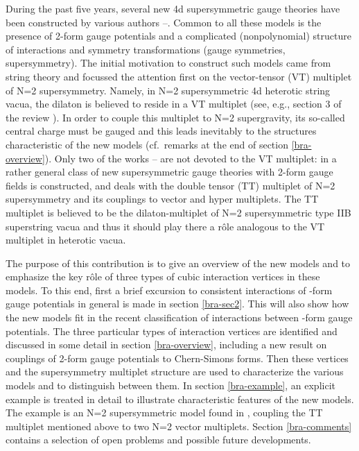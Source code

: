 \documentclass[a4paper,12pt]{article}
\begin{document}
During the past five years, several new
4d supersymmetric gauge theories have been constructed
by various authors 
\cite{bra-1}--\cite{bra-13}.
Common to all these
models is the presence of 2-form gauge potentials
and a complicated (nonpolynomial) structure of
interactions and symmetry transformations (gauge symmetries, supersymmetry).
The initial motivation to construct such models came from
string theory and focussed the attention first
on the vector-tensor (VT) multiplet
\cite{bra-VT1,bra-VT2} of N=2 supersymmetry. 
Namely, in N=2 supersymmetric 4d heterotic string vacua,
the dilaton is believed to reside in a VT multiplet
(see, e.g., section 3 of the review \cite{bra-LF}). 
In order to couple this multiplet
to N=2 supergravity, its so-called central charge must be gauged
and this leads inevitably to the structures
characteristic of the new models (cf.\ remarks at the end
of section \ref{bra-overview}).
Only two of the works \cite{bra-1}--\cite{bra-13} are not
devoted to the VT multiplet: in \cite{bra-11}
a rather general class of new supersymmetric gauge theories
with 2-form gauge fields is constructed, and \cite{bra-13}
deals with the double tensor (TT) multiplet
of N=2 supersymmetry and its couplings to vector and hyper multiplets.
The TT multiplet is believed to be the dilaton-multiplet
of N=2 supersymmetric type IIB superstring vacua \cite{bra-LF} and thus 
it should play there a r\^ole analogous to the VT multiplet 
in heterotic vacua.

The purpose of this contribution is to give an overview
of the new models and to emphasize the key r\^ole of
three types of cubic interaction vertices in these models.
To this end, first a brief
excursion to consistent interactions of \coordHE{}-form gauge potentials
in general is made in section \ref{bra-sec2}. This will also show
how the new models fit in the recent
classification \cite{bra-HK1,bra-HK2,bra-HK3} of interactions
between \coordHE{}-form gauge potentials. The
three particular types of interaction vertices are identified
and discussed in some detail in section \ref{bra-overview},
including a new result on couplings of 2-form gauge potentials
to Chern-Simons forms. Then
these vertices and the supersymmetry multiplet structure
are used to characterize the various
models and to distinguish between them.
In section \ref{bra-example}, an explicit example
is treated in detail to illustrate characteristic features 
of the new models.
The example is an N=2 supersymmetric model 
found in \cite{bra-13},
coupling the TT multiplet mentioned above
to two N=2 vector multiplets. Section \ref{bra-comments} contains 
a selection of open problems and possible
future developments.
\end{document}
